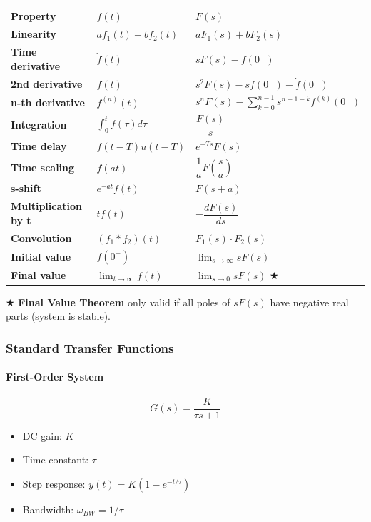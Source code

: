 \documentclass[11pt,a4paper]{book}
\begin{document}
\begin{center}
\begin{tabular}{|l|l|l|}
\hline
Property & $f(t)$ & $F(s)$ \\
\hline
\textbf{Linearity} & $af_1(t) + bf_2(t)$ & $aF_1(s) + bF_2(s)$ \\
\textbf{Time derivative} & $\dot{f}(t)$ & $sF(s) - f(0^-)$ \\
\textbf{2nd derivative} & $\ddot{f}(t)$ & $s^2 F(s) - sf(0^-) - \dot{f}(0^-)$ \\
\textbf{n-th derivative} & $f^{(n)}(t)$ & $s^n F(s) - \sum_{k=0}^{n-1} s^{n-1-k} f^{(k)}(0^-)$ \\
\textbf{Integration} & $\int_0^t f(\tau) d\tau$ & $\dfrac{F(s)}{s}$ \\
\textbf{Time delay} & $f(t - T)u(t-T)$ & $e^{-Ts} F(s)$ \\
\textbf{Time scaling} & $f(at)$ & $\dfrac{1}{a} F\!\left(\dfrac{s}{a}\right)$ \\
\textbf{s-shift} & $e^{-at} f(t)$ & $F(s+a)$ \\
\textbf{Multiplication by t} & $t f(t)$ & $-\dfrac{dF(s)}{ds}$ \\
\textbf{Convolution} & $(f_1 * f_2)(t)$ & $F_1(s) \cdot F_2(s)$ \\
\textbf{Initial value} & $f(0^+)$ & $\lim_{s \to \infty} sF(s)$ \\
\textbf{Final value} & $\lim_{t \to \infty} f(t)$ & $\lim_{s \to 0} sF(s)$ ★ \\
\hline
\end{tabular}
\end{center}

★ \textbf{Final Value Theorem} only valid if all poles of $sF(s)$ have negative real parts (system is stable).

\medskip\noindent\hrulefill\medskip

\subsubsection{Standard Transfer Functions}

\paragraph{First-Order System}

\[G(s) = \frac{K}{\tau s + 1}\]

\begin{itemize}
\item DC gain: $K$
\item Time constant: $\tau$
\item Step response: $y(t) = K(1 - e^{-t/\tau})$
\item Bandwidth: $\omega_{BW} = 1/\tau$
\end{itemize}
\end{document}
